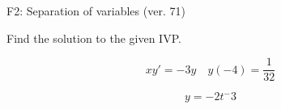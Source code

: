 \begin{exercise}
  \begin{exerciseTitle}F2: Separation of variables (ver. 71)\end{exerciseTitle}
  \begin{exerciseStatement}
    
Find the solution to the given IVP.

    
\[xy'= -3 y \hspace{1em} y( -4 ) = \frac{1}{32}\]

  \end{exerciseStatement}
  \begin{exerciseAnswer}
    
\[y= -2 t^ -3\]

  \end{exerciseAnswer}
\end{exercise}